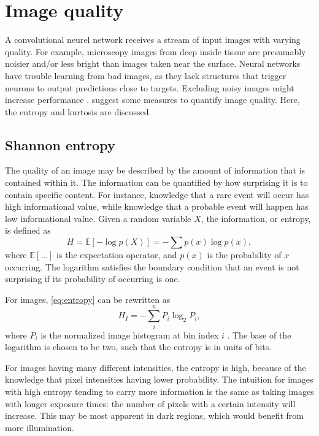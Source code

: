 
\section{Image quality}\label{subsec:imq}
A convolutional neurel network receives a stream of input images with varying quality.
For example, microscopy images from deep inside tissue are presumably noisier and/or less bright than images taken near the surface.
Neural networks have trouble learning from bad images, as they lack structures that trigger neurons to output predictions close to targets.
Excluding noisy images might increase performance \cite{Blokker2022}.
\textcite{Koho2016} suggest some measures to quantify image quality.
Here, the entropy and kurtosis are discussed.

\subsection{Shannon entropy}
The quality of an image may be described by the amount of information that is contained within it.
The information can be quantified by how surprising it is to contain specific content.
For instance, knowledge that a rare event will occur has high informational value, while knowledge that a probable event will happen has low informational value.
Given a random variable $X$, the information, or entropy, is defined as
\begin{equation}\label{eq:entropy}
    H = \mathbb{E}[-\log p(X)] = -\sum p(x) \log p(x),
\end{equation}
where $\mathbb{E}[\ldots]$ is the expectation operator, and $p(x)$ is the probability of $x$ occurring.
The logarithm satisfies the boundary condition that an event is not surprising if its probability of occurring is one.

For images, \cref{eq:entropy} can be rewritten as
\begin{equation}
    H_I = -\sum_{i}^n P_i \log_2 P_i,
\end{equation}
where $P_i$ is the normalized image histogram at bin index $i$ \cite{Koho2016}.
The base of the logarithm is chosen to be two, such that the entropy is in units of bits.

For images having many different intensities, the entropy is high, because of the knowledge that pixel intensities having lower probability.
The intuition for images with high entropy tending to carry more information is the same as taking images with longer exposure times:
the number of pixels with a certain intensity will increase.
This may be most apparent in dark regions, which would benefit from more illumination.

